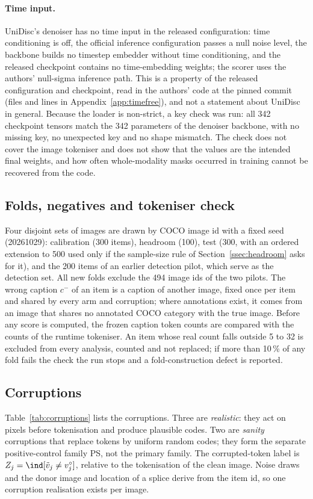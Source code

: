 \paragraph{Time input.}
UniDisc's denoiser has no time input in the released configuration: time conditioning is off, the official inference
configuration passes a null noise level, the backbone builds no timestep embedder without time conditioning, and the released
checkpoint contains no time-embedding weights; the scorer uses the authors' null-sigma inference path.
This is a property of the released configuration and checkpoint, read in the authors' code at the pinned commit (files and lines in
Appendix~\ref{app:timefree}), and not a statement about UniDisc in general.
Because the loader is non-strict, a key check was run: all 342 checkpoint tensors match the 342 parameters of the denoiser backbone,
with no missing key, no unexpected key and no shape mismatch.
The check does not cover the image tokeniser and does not show that the values are the intended final weights, and how often
whole-modality masks occurred in training cannot be recovered from the code.

\subsection{Folds, negatives and tokeniser check}\label{ssec:folds}
Four disjoint sets of images are drawn by COCO image id with a fixed seed (20261029): calibration (300 items), headroom
(100), test (300, with an ordered extension to 500 used only if the sample-size rule of Section~\ref{ssec:headroom} asks
for it), and the 200 items of an earlier detection pilot, which serve as the detection set.
All new folds exclude the 494 image ids of the two pilots.
The wrong caption $c^-$ of an item is a caption of another image, fixed once per item and shared by every arm and
corruption; where annotations exist, it comes from an image that shares no annotated COCO category with the true image.
Before any score is computed, the frozen caption token counts are compared with the counts of the runtime tokeniser.
An item whose real count falls outside 5 to 32 is excluded from every analysis, counted and not replaced; if more than
10\,\% of any fold fails the check the run stops and a fold-construction defect is reported.

\subsection{Corruptions}\label{ssec:corruptions}
Table~\ref{tab:corruptions} lists the corruptions.
Three are \emph{realistic}: they act on pixels before tokenisation and produce plausible codes.
Two are \emph{sanity} corruptions that replace tokens by uniform random codes; they form the separate positive-control family PS,
not the primary family.
The corrupted-token label is $Z_j=\ind[\tilde v_j\neq v^\circ_j]$, relative to the tokenisation of the clean image.
Noise draws and the donor image and location of a splice derive from the item id, so one corruption realisation exists per image.

